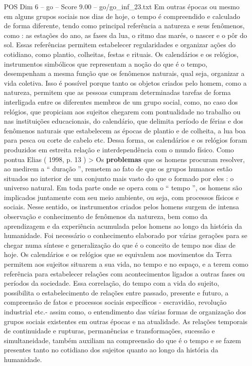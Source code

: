 \begin{textsample}{POS Dim 6 – go – Score 9.00 – go/go\_inf\_23.txt}
Em outras épocas ou mesmo em alguns grupos sociais nos dias de hoje, o tempo é compreendido e calculado de forma diferente, tendo como principal referência a natureza e seus fenômenos, como : as estações do ano, as fases da lua, o ritmo das marés, o nascer e o pôr do sol.
Essas referências permitem estabelecer regularidades e organizar ações do cotidiano, como plantio, colheitas, festas e rituais.
Os calendários e os relógios, instrumentos simbólicos que representam a noção do que é o tempo, desempenham a mesma função que os fenômenos naturais, qual seja, organizar a vida coletiva.
Isso é possível porque tanto os objetos criados pelo homem, como a natureza, permitem que as pessoas cumpram determinadas tarefas de forma interligada entre os diferentes membros de um grupo social, como, no caso dos relógios, que propiciam aos sujeitos chegarem com pontualidade no trabalho ou nas instituições educacionais, do calendário, que delimita período de férias e dos fenômenos naturais que estabelecem as épocas de plantio e de colheita, a lua boa para pesca ou corte de cabelo etc.
Dessa forma, os calendários e os relógios foram produzidos em estreita relação e interdependência com o mundo físico.
Como pontua Elias ( 1998, p. 13 ) > Os \textbf{problemas} que os homens procuram resolver, ao medirem a “ duração ”, remetem ao fato de que os grupos humanos estão situados no interior de um conjunto mais vasto do que o formado por eles : o universo natural.
Em toda parte onde se opera com o “ tempo ”, os homens são implicados juntamente com seu meio ambiente, ou seja, com processos físicos e sociais.
Nesse sentido, os instrumentos criados pelos homens surgem de intensa observação e conhecimento de fenômenos da natureza, bem como da aprendizagem e da experiência acumulada pelos homens ao longo da história da humanidade.
Foi necessário o conhecimento elaborado por várias gerações para se chegar numa síntese e generalização do que é o conceito de tempo nos dias de hoje.
Os calendários e os relógios que se equivalem aos movimentos da Terra permitem aos sujeitos situarem a sua vida, no tempo e no espaço, e a terem como referência para estabelecer relações com acontecimentos ligados a outras fases ou períodos da sociedade.
Essa correlação, do tempo com a vida do sujeito, possibilita o estabelecimento de relações entre passado, presente e futuro, a compreensão de fatos e processos sociais específicos - escravidão, revolução industrial etc.- assim como, o entendimento das várias formas de organização dos grupos sociais existentes em outras épocas e na atualidade.
As relações temporais de continuidade e rupturas, permanências e transformações, sucessão e simultaneidade, também auxiliam na compreensão do que é o tempo e se fazem presentes tanto no cotidiano dos sujeitos quanto ao longo da história da humanidade.

\end{textsample}
